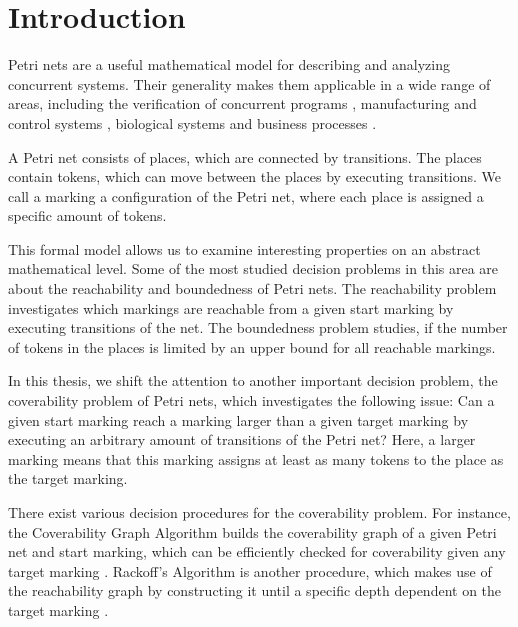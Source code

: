 \chapter{Introduction}\label{chapter:introduction}

%

Petri nets are a useful mathematical model for describing and analyzing concurrent systems. Their generality makes them applicable in a wide range of areas, including the verification of concurrent programs \cite{german_92,kaiser_14}, manufacturing and control systems \cite{silva_97, wenzelburger_19}, biological systems \cite{carvalho_18, cherdal_18} and business processes \cite{hee_13}.


A Petri net consists of places, which are connected by transitions. The places contain tokens, which can move between the places by executing transitions. We call a marking a configuration of the Petri net, where each place is assigned a specific amount of tokens.

This formal model allows us to examine interesting properties on an abstract mathematical level. Some of the most studied decision problems in this area are about the reachability and boundedness of Petri nets. The reachability problem investigates which markings are reachable from a given start marking by executing transitions of the net. The boundedness problem studies, if the number of tokens in the places is limited by an upper bound for all reachable markings.

In this thesis, we shift the attention to another important decision problem, the coverability problem of Petri nets, which investigates the following issue:
Can a given start marking reach a marking larger than a given target marking by executing an arbitrary amount of transitions of the Petri net? Here, a larger marking means that this marking assigns at least as many tokens to the place as the target marking.

There exist various decision procedures for the coverability problem. For instance, the Coverability Graph Algorithm builds the coverability graph of a given Petri net and start marking, which can be efficiently checked for coverability given any target marking \cite{finkel_91}. Rackoff's Algorithm is another procedure, which makes use of the reachability graph by constructing it until a specific depth dependent on the target marking \cite{rackoff_78,esparza_19}. 

